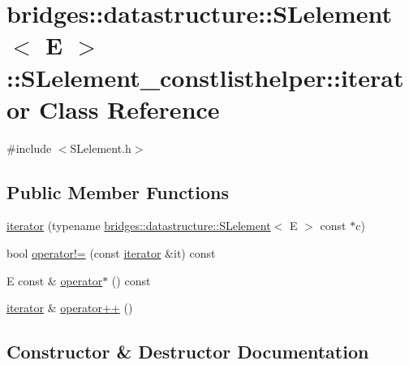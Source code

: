 \hypertarget{classbridges_1_1datastructure_1_1_s_lelement_1_1_s_lelement__constlisthelper_1_1iterator}{}\section{bridges\+:\+:datastructure\+:\+:S\+Lelement$<$ E $>$\+:\+:S\+Lelement\+\_\+constlisthelper\+:\+:iterator Class Reference}
\label{classbridges_1_1datastructure_1_1_s_lelement_1_1_s_lelement__constlisthelper_1_1iterator}


{\ttfamily \#include $<$S\+Lelement.\+h$>$}

\subsection*{Public Member Functions}
\begin{DoxyCompactItemize}
\item 
\mbox{\hyperlink{classbridges_1_1datastructure_1_1_s_lelement_1_1_s_lelement__constlisthelper_1_1iterator_a438b2bda67331a3a989ea5fa45c30f7f}{iterator}} (typename \mbox{\hyperlink{classbridges_1_1datastructure_1_1_s_lelement}{bridges\+::datastructure\+::\+S\+Lelement}}$<$ E $>$ const $\ast$c)
\item 
bool \mbox{\hyperlink{classbridges_1_1datastructure_1_1_s_lelement_1_1_s_lelement__constlisthelper_1_1iterator_a65e17e54ef5f08c3deaee084951bda6a}{operator!=}} (const \mbox{\hyperlink{classbridges_1_1datastructure_1_1_s_lelement_1_1_s_lelement__constlisthelper_1_1iterator}{iterator}} \&it) const
\item 
E const  \& \mbox{\hyperlink{classbridges_1_1datastructure_1_1_s_lelement_1_1_s_lelement__constlisthelper_1_1iterator_a8d41bb42239d7df41879aa67d15842ed}{operator$\ast$}} () const
\item 
\mbox{\hyperlink{classbridges_1_1datastructure_1_1_s_lelement_1_1_s_lelement__constlisthelper_1_1iterator}{iterator}} \& \mbox{\hyperlink{classbridges_1_1datastructure_1_1_s_lelement_1_1_s_lelement__constlisthelper_1_1iterator_a3ae6ebe78df57195446770f1c7872fdd}{operator++}} ()
\end{DoxyCompactItemize}


\subsection{Constructor \& Destructor Documentation}
\mbox{\label{classbridges_1_1datastructure_1_1_s_lelement_1_1_s_lelement__constlisthelper_1_1iterator_a438b2bda67331a3a989ea5fa45c30f7f}} 
